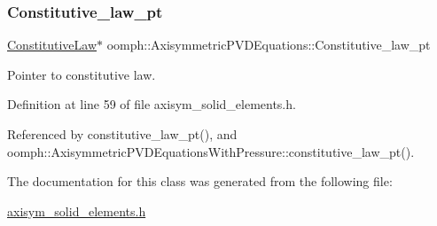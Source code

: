 \subsubsection{\texorpdfstring{Constitutive\+\_\+law\+\_\+pt}{Constitutive\_law\_pt}}
{\footnotesize\ttfamily \hyperlink{classoomph_1_1ConstitutiveLaw}{Constitutive\+Law}$\ast$ oomph\+::\+Axisymmetric\+P\+V\+D\+Equations\+::\+Constitutive\+\_\+law\+\_\+pt\hspace{0.3cm}{\ttfamily [private]}}



Pointer to constitutive law. 



Definition at line 59 of file axisym\+\_\+solid\+\_\+elements.\+h.



Referenced by constitutive\+\_\+law\+\_\+pt(), and oomph\+::\+Axisymmetric\+P\+V\+D\+Equations\+With\+Pressure\+::constitutive\+\_\+law\+\_\+pt().



The documentation for this class was generated from the following file\+:\begin{DoxyCompactItemize}
\item 
\hyperlink{axisym__solid__elements_8h}{axisym\+\_\+solid\+\_\+elements.\+h}\end{DoxyCompactItemize}
